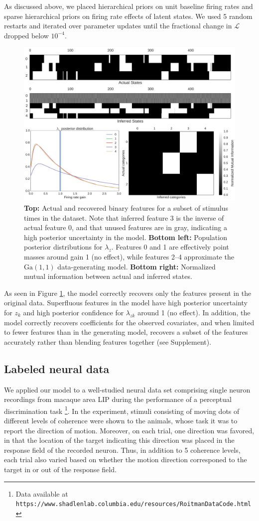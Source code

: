 \documentclass{article} %
\begin{document}
As discussed above, we placed hierarchical priors on unit baseline firing rates and sparse hierarchical priors on firing rate effects of latent states. We used 5 random restarts and iterated over parameter updates until the fractional change in $\mathcal{L}$ dropped below $10^{-4}$.

\begin{figure}[ht]
    \center
    \includegraphics[width=0.6\linewidth]{figures/synthetic}
    \caption{\textbf{Top:} Actual and recovered binary features for a subset of stimulus times in the dataset. Note that inferred feature 3 is the inverse of actual feature 0, and that unused features are in gray, indicating a high posterior uncertainty in the model. \textbf{Bottom left:} Population posterior distributions for $\lambda_z$. Features 0 and 1 are effectively point masses around gain 1 (no effect), while features 2--4 approximate the $\text{Ga}(1, 1)$ data-generating model. \textbf{Bottom right:} Normalized mutual information between actual and inferred states.}
    \label{synthetic}
\end{figure}

As seen in Figure \ref{synthetic}, the model correctly recovers only the features present in the original data. Superfluous features in the model have high posterior uncertainty for $z_k$ and high posterior confidence for $\lambda_{zk}$ around 1 (no effect). In addition, the model correctly recovers coefficients for the observed covariates, and when limited to fewer features than in the generating model, recovers a subset of the features accurately rather than blending features together (see Supplement).

\subsection{Labeled neural data}
We applied our model to a well-studied neural data set comprising single neuron recordings from macaque area LIP during the performance of a perceptual discrimination task \cite{roitman2002response}\footnote{Data available at \texttt{https://www.shadlenlab.columbia.edu/resources/RoitmanDataCode.html}}. In the experiment, stimuli consisting of moving dots of different levels of coherence were shown to the animals, whose task it was to report the direction of motion. Moreover, on each trial, one direction was favored, in that the location of the target indicating this direction was placed in the response field of the recorded neuron. Thus, in addition to 5 coherence levels, each trial also varied based on whether the motion direction corresponed to the target in or out of the response field.
\end{document}
